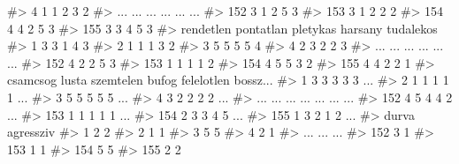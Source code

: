 \documentclass[
  letterpaper,
]{krantz}
\makeatletter
\newenvironment{Shaded}{\begin{snugshade}}{\end{snugshade}}
\newcommand{\CommentTok}[1]{\textcolor[rgb]{0.37,0.37,0.37}{#1}}
\newenvironment{kframe}{%
\medskip{}
\setlength{\fboxsep}{.8em}
 \def\at@end@of@kframe{}%
 \ifinner\ifhmode%
  \def\at@end@of@kframe{\end{minipage}}%
  \begin{minipage}{\columnwidth}%
 \fi\fi%
 \def\FrameCommand##1{\hskip\@totalleftmargin \hskip-\fboxsep
 \colorbox{shadecolor}{##1}\hskip-\fboxsep
     \hskip-\linewidth \hskip-\@totalleftmargin \hskip\columnwidth}%
 \MakeFramed {\advance\hsize-\width
   \@totalleftmargin\z@ \linewidth\hsize
   \@setminipage}}%
 {\par\unskip\endMakeFramed%
 \at@end@of@kframe}
\renewenvironment{Shaded}{\begin{kframe}}{\end{kframe}}
\makeatother
\begin{document}
\begin{Shaded}
\begin{Highlighting}[]
\CommentTok{\#\textgreater{} 4         1          1        2         3           2}
\CommentTok{\#\textgreater{} ...     ...        ...      ...       ...         ...}
\CommentTok{\#\textgreater{} 152       3          1        2         5           3}
\CommentTok{\#\textgreater{} 153       3          1        2         2           2}
\CommentTok{\#\textgreater{} 154       4          4        2         5           3}
\CommentTok{\#\textgreater{} 155       3          3        4         5           3}
\CommentTok{\#\textgreater{}     rendetlen pontatlan pletykas harsany tudalekos}
\CommentTok{\#\textgreater{} 1           3         3        1       4         3}
\CommentTok{\#\textgreater{} 2           1         1        1       3         2}
\CommentTok{\#\textgreater{} 3           5         5        5       5         4}
\CommentTok{\#\textgreater{} 4           2         3        2       2         3}
\CommentTok{\#\textgreater{} ...       ...       ...      ...     ...       ...}
\CommentTok{\#\textgreater{} 152         4         2        2       5         3}
\CommentTok{\#\textgreater{} 153         1         1        1       1         2}
\CommentTok{\#\textgreater{} 154         4         5        5       3         2}
\CommentTok{\#\textgreater{} 155         4         4        2       2         1}
\CommentTok{\#\textgreater{}     csamcsog lusta szemtelen bufog felelotlen bossz...}
\CommentTok{\#\textgreater{} 1          3     3         3     3          3      ...}
\CommentTok{\#\textgreater{} 2          1     1         1     1          1      ...}
\CommentTok{\#\textgreater{} 3          5     5         5     5          5      ...}
\CommentTok{\#\textgreater{} 4          3     2         2     2          2      ...}
\CommentTok{\#\textgreater{} ...      ...   ...       ...   ...        ...      ...}
\CommentTok{\#\textgreater{} 152        4     5         4     4          2      ...}
\CommentTok{\#\textgreater{} 153        1     1         1     1          1      ...}
\CommentTok{\#\textgreater{} 154        2     3         3     4          5      ...}
\CommentTok{\#\textgreater{} 155        1     3         2     1          2      ...}
\CommentTok{\#\textgreater{}     durva agressziv}
\CommentTok{\#\textgreater{} 1       2         2}
\CommentTok{\#\textgreater{} 2       1         1}
\CommentTok{\#\textgreater{} 3       5         5}
\CommentTok{\#\textgreater{} 4       2         1}
\CommentTok{\#\textgreater{} ...   ...       ...}
\CommentTok{\#\textgreater{} 152     3         1}
\CommentTok{\#\textgreater{} 153     1         1}
\CommentTok{\#\textgreater{} 154     5         5}
\CommentTok{\#\textgreater{} 155     2         2}
\end{Highlighting}
\end{Shaded}
\end{document}
